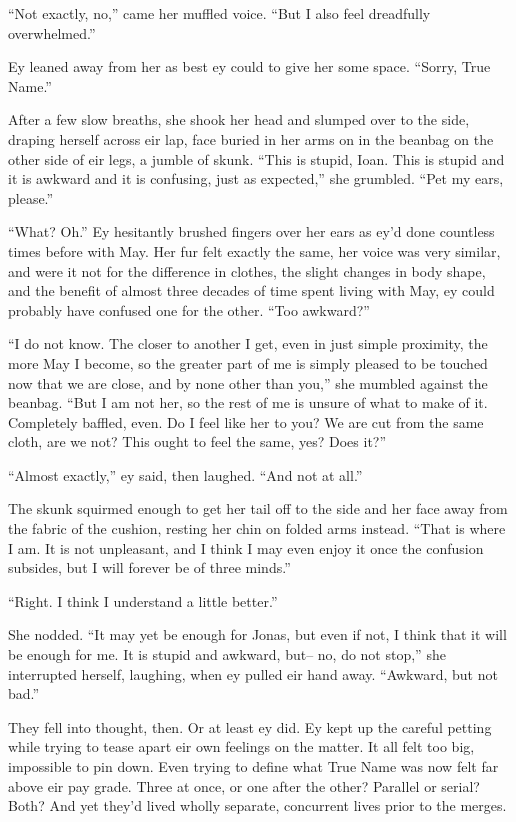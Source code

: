 ``Not exactly, no,'' came her muffled voice. ``But I also feel dreadfully overwhelmed.''

Ey leaned away from her as best ey could to give her some space. ``Sorry, True Name.''

After a few slow breaths, she shook her head and slumped over to the side, draping herself across eir lap, face buried in her arms on in the beanbag on the other side of eir legs, a jumble of skunk. ``This is stupid, Ioan. This is stupid and it is awkward and it is confusing, just as expected,'' she grumbled. ``Pet my ears, please.''

``What? Oh.'' Ey hesitantly brushed fingers over her ears as ey'd done countless times before with May. Her fur felt exactly the same, her voice was very similar, and were it not for the difference in clothes, the slight changes in body shape, and the benefit of almost three decades of time spent living with May, ey could probably have confused one for the other. ``Too awkward?''

``I do not know. The closer to another I get, even in just simple proximity, the more May I become, so the greater part of me is simply pleased to be touched now that we are close, and by none other than you,'' she mumbled against the beanbag. ``But I am not her, so the rest of me is unsure of what to make of it. Completely baffled, even. Do I feel like her to you? We are cut from the same cloth, are we not? This ought to feel the same, yes? Does it?''

``Almost exactly,'' ey said, then laughed. ``And not at all.''

The skunk squirmed enough to get her tail off to the side and her face away from the fabric of the cushion, resting her chin on folded arms instead. ``That is where I am. It is not unpleasant, and I think I may even enjoy it once the confusion subsides, but I will forever be of three minds.''

``Right. I think I understand a little better.''

She nodded. ``It may yet be enough for Jonas, but even if not, I think that it will be enough for me. It is stupid and awkward, but-- no, do not stop,'' she interrupted herself, laughing, when ey pulled eir hand away. ``Awkward, but not bad.''

They fell into thought, then. Or at least ey did. Ey kept up the careful petting while trying to tease apart eir own feelings on the matter. It all felt too big, impossible to pin down. Even trying to define what True Name was now felt far above eir pay grade. Three at once, or one after the other? Parallel or serial? Both? And yet they'd lived wholly separate, concurrent lives prior to the merges.

